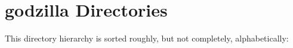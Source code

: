 \section{godzilla Directories}
This directory hierarchy is sorted roughly, but not completely, alphabetically:\begin{CompactList}
\item {}
\begin{CompactList}
\item {}
\begin{CompactList}
\item {}
\begin{CompactList}
\item {}
\begin{CompactList}
\item {}
\begin{CompactList}
\item {}
\item {}
\item {}
\end{CompactList}
\end{CompactList}
\end{CompactList}
\end{CompactList}
\end{CompactList}
\end{CompactList}
